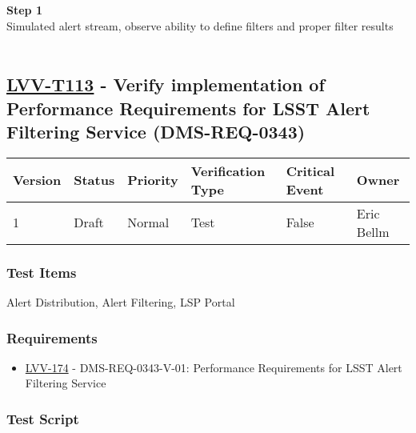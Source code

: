 \textbf{Step 1}\\
Simulated alert stream, observe ability to define filters and proper
filter results\\
~\\

\hypertarget{lvv-t113---verify-implementation-of-performance-requirements-for-lsst-alert-filtering-service-dms-req-0343}{%
\subsection{\texorpdfstring{\href{https://jira.lsstcorp.org/secure/Tests.jspa\#/testCase/LVV-T113}{LVV-T113}
- Verify implementation of Performance Requirements for LSST Alert
Filtering Service
(DMS-REQ-0343)}{LVV-T113 - Verify implementation of Performance Requirements for LSST Alert Filtering Service (DMS-REQ-0343)}}\label{lvv-t113---verify-implementation-of-performance-requirements-for-lsst-alert-filtering-service-dms-req-0343}}

\begin{longtable}[]{@{}llllll@{}}
\toprule
Version & Status & Priority & Verification Type & Critical Event &
Owner\tabularnewline
\midrule
\endhead
1 & Draft & Normal & Test & False & Eric Bellm\tabularnewline
\bottomrule
\end{longtable}

\hypertarget{test-items-89}{%
\subsubsection{Test Items}\label{test-items-89}}

Alert Distribution, Alert Filtering, LSP Portal~

\hypertarget{requirements-90}{%
\subsubsection{Requirements}\label{requirements-90}}

\begin{itemize}
\tightlist
\item
  \href{https://jira.lsstcorp.org/browse/LVV-174}{LVV-174} -
  DMS-REQ-0343-V-01: Performance Requirements for LSST Alert Filtering
  Service
\end{itemize}

\hypertarget{test-script-90}{%
\subsubsection{Test Script}\label{test-script-90}}

